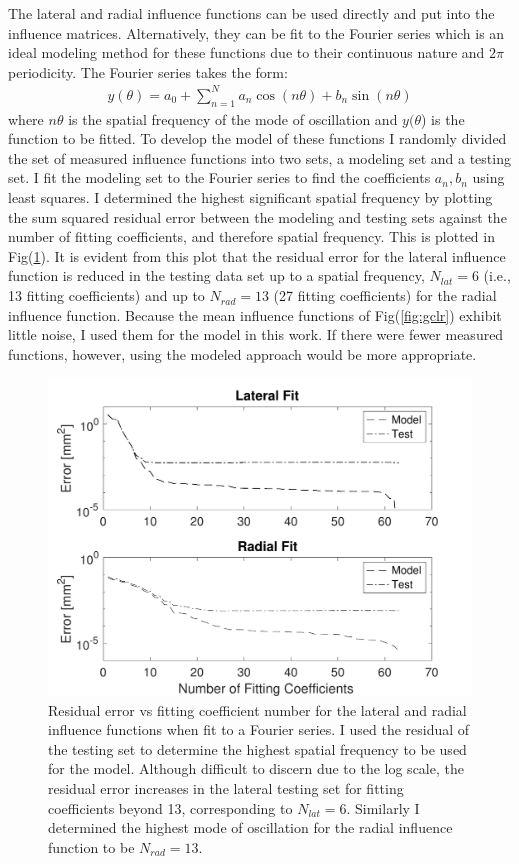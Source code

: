 \documentclass[journal]{IEEEtran}
\begin{document}
The lateral and radial influence functions can be used directly and put into the influence matrices.  Alternatively, they can be fit to the Fourier series which is an ideal modeling method for these functions due to their continuous nature and $2\pi$ periodicity.  The Fourier series takes the form:
\begin{align*}
y(\theta) =a_0 + \sum_{n=1}^{N} a_n\cos(n\theta) + b_n\sin(n\theta)
\end{align*}
where $n\theta$ is the spatial frequency of the mode of oscillation and $y(\theta$) is the function to be fitted.  To develop the model of these functions I randomly divided the set of measured influence functions into two sets, a modeling set and a testing set.  I fit the modeling set to the Fourier series to find the coefficients $a_n, b_n$ using least squares.  I determined the highest significant spatial frequency by plotting the sum squared residual error between the modeling and testing sets against the number of fitting coefficients, and therefore spatial frequency. This is plotted in Fig(\ref{fig:Fourier}).  It is evident from this plot that the residual error for the lateral influence function is reduced in the testing data set up to a spatial frequency, $N_{lat} = 6$ (i.e., 13 fitting coefficients) and up to $N_{rad} = 13$ (27 fitting coefficients) for the radial influence function. Because the mean influence functions of Fig(\ref{fig:gclr}) exhibit little noise, I used them for the model in this work.  If there were fewer measured functions, however, using the modeled approach would be more appropriate. 

\begin{figure}[!t]
\centering
\includegraphics[width=3.25 in]{./figs/Fourier}
\caption{Residual error vs fitting coefficient number for the lateral and radial influence functions when fit to a Fourier series.  I used the residual of the testing set to determine the highest spatial frequency to be used for the model. Although difficult to discern due to the log scale, the residual error increases in the lateral testing set for fitting coefficients beyond 13, corresponding to $N_{lat}=6$.  Similarly I determined the highest mode of oscillation for the radial influence function to be $N_{rad} = 13$.}
\label{fig:Fourier}
\end{figure}
\end{document}
